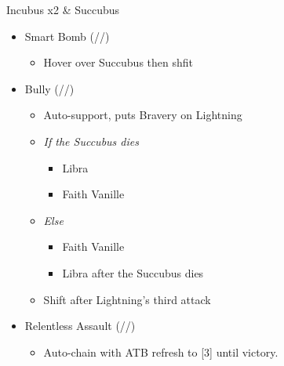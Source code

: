 \documentclass{report}
\begin{document}
\renewcommand{\first}{[1] Relentless Assault (\rav/\com/\rav)}
\renewcommand{\second}{[2] Bully (\syn/\com/\sab)}
\renewcommand{\third}{[3] Relentless Assault (\rav/\com/\rav)}
\renewcommand{\fourth}{[4] Smart Bomb (\rav/\rav/\sab)}
\renewcommand{\fifth}{[5] Tri-Disaster (\rav/\rav/\rav)}
\renewcommand{\sixth}{[6] Tri-Disaster (\rav/\rav/\rav)}

\begin{battle}{Incubus x2 \& Succubus}
\begin{itemize}
    \item \fourth
    \begin{itemize}
        \item Hover over Succubus then shfit
    \end{itemize}
    \item \second
    \begin{itemize}
        \item Auto-support, puts Bravery on Lightning
        \item \textit{If the Succubus dies}
        \begin{itemize}
            \item Libra
            \item Faith Vanille
        \end{itemize}
        \item \textit{Else}
        \begin{itemize}
            \item Faith Vanille
            \item Libra after the Succubus dies
        \end{itemize}
        \item Shift after Lightning's third attack
    \end{itemize}
    \item \first
    \begin{itemize}
        \item Auto-chain with ATB refresh to [3] until victory.
    \end{itemize}
\end{itemize}
 
\end{battle}
\end{document}
